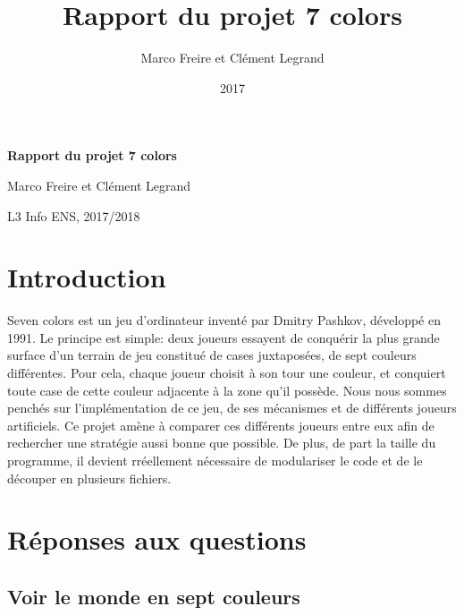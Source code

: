 \documentclass[12pt,a4paper,twoside]{article}
\author{Marco Freire et Clément Legrand}
\date{2017}
\title{Rapport du projet 7 colors}
\let\oldmaketitle=\maketitle
\def\maketitle{}
\begin{document}
\maketitle
\renewcommand{\v}[1]{\ensuremath{\overrightarrow{#1}}\xspace}
\let\oldcite=\cite
\def\cite#1{~\oldcite{#1}\xspace}
\let\oldref=\ref
\def\ref#1{~\oldref{#1}\xspace}
\let\oldeqref=\eqref
\def\eqref#1{~\oldeqref{#1}\xspace}
\let\leq=\leqslant
\let\geq=\geqslant
\let\le=\leqslant
\let\ge=\geqslant
\def\R{\ensuremath{\mathbb{R}}\xspace}
\pagestyle{empty} 
\let\maketitle=\oldmaketitle

\pagestyle{fancy}
\fancyhead{}
\fancyfoot{}
\lhead[\thepage]{\sffamily\itshape \leftmark}

\begin{center}
\bgroup\bf \LARGE Rapport du projet 7 colors\egroup\medskip

\large Marco Freire et Clément Legrand \smallskip

\normalsize L3 Info ENS, 2017/2018
\end{center}

\section{Introduction}
\label{sec:orgheadline1}
Seven colors est un jeu d'ordinateur inventé par Dmitry Pashkov,
développé en 1991. Le principe est simple: deux joueurs essayent de
conquérir la plus grande surface d'un terrain de jeu constitué de
cases juxtaposées, de sept couleurs différentes. Pour cela, chaque
joueur choisit à son tour une couleur, et conquiert toute case de
cette couleur adjacente à la zone qu'il possède.  Nous nous sommes
penchés sur l'implémentation de ce jeu, de ses mécanismes et de
différents joueurs artificiels. Ce projet amène à comparer ces
différents joueurs entre eux afin de rechercher une stratégie aussi
bonne que possible. De plus, de part la taille du programme, il
devient rréellement nécessaire de modulariser le code et de le
découper en plusieurs fichiers.
\section{Réponses aux questions}
\label{sec:orgheadline25}
\subsection{Voir le monde en sept couleurs}
\label{sec:orgheadline9}
\end{document}
